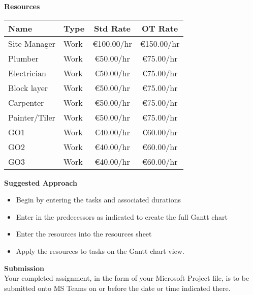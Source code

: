 \newpage
\large\textbf{Resources}\\
\vspace{.25cm}

\begin{tabular}{|l|l|c|c|}
	\hline 
	\textbf{Name} & \textbf{Type} & \textbf{Std Rate} & \textbf{OT Rat}e \\ 
	\hline 
	Site Manager	& Work	& \euro100.00/hr & 	\euro150.00/hr\\
	Plumber			& Work	& \euro50.00/hr	& \euro75.00/hr\\
	Electrician		& Work	& \euro50.00/hr	& \euro75.00/hr\\
	Block layer		& Work	& \euro50.00/hr	& \euro75.00/hr\\
	Carpenter		& Work	& \euro50.00/hr	& \euro75.00/hr\\
	Painter/Tiler	& Work	& \euro50.00/hr	& \euro75.00/hr\\
	GO1				& Work	& \euro40.00/hr	& \euro60.00/hr\\
	GO2				& Work	& \euro40.00/hr	& \euro60.00/hr\\
	GO3				& Work	& \euro40.00/hr	& \euro60.00/hr\\
	\hline
\end{tabular} 



\vspace{.5cm}

\large\textbf{Suggested Approach}\\

\begin{itemize}
	\item Begin by entering the tasks and associated durations
	\item Enter in the predecessors as indicated to create the full Gantt chart
	\item Enter the resources into the resources sheet
	\item Apply the resources to tasks on the Gantt chart view.

\end{itemize}

\vspace{1cm}

\large\textbf{Submission}\\
Your completed assignment, in the form of your Microsoft Project file, is to be submitted onto MS Teams on or before the date or time indicated there.

